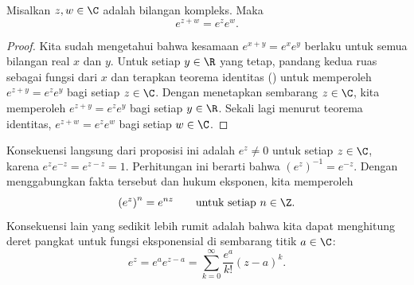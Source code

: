\begin{myfigureht}
\caption{Grafik bagian real (kiri) dan bagian imajiner (kanan)
dari eksponensial kompleks $e^z = e^{x+iy}$. Sumbu $x$ membentang dari $-4$ hingga
$4$, sumbu $y$ membentang dari $-6$ hingga $6$, dan sumbu vertikal membentang dari
$-e^{4} \approx -54.6$
hingga
$e^{4} \approx 54.6$. Grafik eksponensial real ($y=0$)
ditandai dengan garis tebal.\label{fig:complexexpgraphs}}
\end{myfigureht}

\begin{prop}
Misalkan $z,w \in \C$ adalah bilangan kompleks. Maka
\begin{equation*}
e^{z+w} = e^z e^w.
\end{equation*}
\end{prop}

\begin{proof}
Kita sudah mengetahui bahwa kesamaan
$e^{x+y} = e^x e^y$ berlaku untuk semua
bilangan real $x$ dan $y$.
Untuk setiap $y \in \R$ yang tetap, pandang kedua ruas sebagai
fungsi dari $x$ dan terapkan teorema identitas
() untuk memperoleh
$e^{z+y} = e^ze^y$ bagi setiap $z \in \C$. Dengan menetapkan sembarang $z \in \C$,
kita memperoleh
$e^{z+y} = e^ze^y$ bagi setiap $y \in \R$. Sekali lagi menurut teorema identitas,
$e^{z+w} = e^z e^w$
bagi setiap $w \in \C$.
\end{proof}

Konsekuensi langsung dari proposisi ini adalah $e^z \neq 0$ untuk setiap $z \in \C$,
karena $e^z e^{-z} = e^{z-z} = 1$.
Perhitungan ini berarti bahwa ${(e^z)}^{-1} = e^{-z}$.
Dengan menggabungkan fakta tersebut dan hukum eksponen, kita memperoleh
\begin{equation*}
{(e^z)}^{n} = e^{nz} \qquad \text{untuk setiap } n \in \Z.
\end{equation*}
Konsekuensi lain yang sedikit lebih rumit adalah bahwa kita
dapat menghitung deret pangkat untuk fungsi eksponensial di sembarang titik $a \in
\C$:
\begin{equation*}
e^z = e^a e^{z-a} = \sum_{k=0}^\infty \frac{e^a}{k!} {(z-a)}^k .
\end{equation*}

